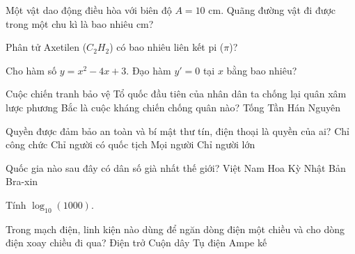 \begin{ex}
    Một vật dao động điều hòa với biên độ $A = 10$ cm. Quãng đường vật đi được trong một chu kì là bao nhiêu cm?
\end{ex}

\begin{ex}
    Phân tử Axetilen ($C_2H_2$) có bao nhiêu liên kết pi ($\pi$)?
\end{ex}

\begin{ex}
    Cho hàm số $y = x^2 - 4x + 3$. Đạo hàm $y' = 0$ tại $x$ bằng bao nhiêu?
\end{ex}

\begin{ex}
    Cuộc chiến tranh bảo vệ Tổ quốc đầu tiên của nhân dân ta chống lại quân xâm lược phương Bắc là cuộc kháng chiến chống quân nào?
    \choice
    {Tống}
    {\True Tần}
    {Hán}
    {Nguyên}
\end{ex}

\begin{ex}
    Quyền được đảm bảo an toàn và bí mật thư tín, điện thoại là quyền của ai?
    \choice
    {Chỉ công chức}
    {Chỉ người có quốc tịch}
    {\True Mọi người}
    {Chỉ người lớn}
\end{ex}

\begin{ex}
    Quốc gia nào sau đây có dân số già nhất thế giới?
    \choice
    {Việt Nam}
    {Hoa Kỳ}
    {\True Nhật Bản}
    {Bra-xin}
\end{ex}

\begin{ex}
    Tính $\log_{10}(1000)$.
\end{ex}

\begin{ex}
    Trong mạch điện, linh kiện nào dùng để ngăn dòng điện một chiều và cho dòng điện xoay chiều đi qua?
    \choice
    {Điện trở}
    {Cuộn dây}
    {\True Tụ điện}
    {Ampe kế}
\end{ex}

